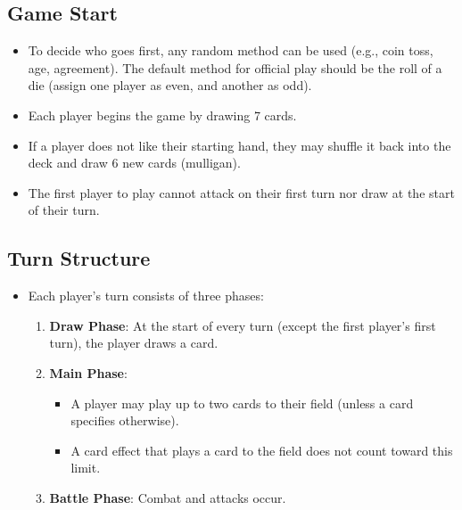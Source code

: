 \subsection{Game Start}
\begin{itemize}
    \item To decide who goes first, any random method can be used (e.g., coin toss, age, agreement). The default method for official play should be the roll of a die (assign one player as even, and another as odd).
    \item Each player begins the game by drawing 7 cards.
    \item If a player does not like their starting hand, they may shuffle it back into the deck and draw 6 new cards (mulligan).
    \item The first player to play cannot attack on their first turn nor draw at the start of their turn.
\end{itemize}








\subsection{Turn Structure}
\begin{itemize}
\item Each player's turn consists of three phases:
	\begin{enumerate}
	    \item \textbf{Draw Phase}: At the start of every turn (except the first player's first turn), the player draws a card.
	    \item \textbf{Main Phase}:
	    \begin{itemize}
	        \item A player may play up to two cards to their field (unless a card specifies otherwise).
	        \item A card effect that plays a card to the field does not count toward this limit.
	    \end{itemize}
	    \item \textbf{Battle Phase}: Combat and attacks occur.
	\end{enumerate}
\end{itemize}









